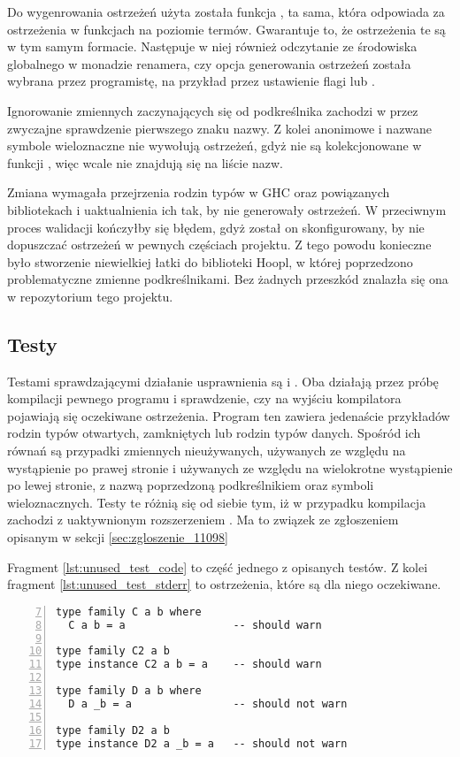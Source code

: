 Do wygenrowania ostrzeżeń użyta została funkcja , ta sama, która odpowiada za ostrzeżenia w funkcjach na poziomie termów. Gwarantuje to, że ostrzeżenia te są w tym samym formacie. Następuje w niej również odczytanie ze środowiska globalnego w monadzie renamera, czy opcja generowania ostrzeżeń została wybrana przez programistę, na przykład przez ustawienie flagi  lub .

Ignorowanie zmiennych zaczynających się od podkreślnika zachodzi w  przez zwyczajne sprawdzenie pierwszego znaku nazwy. Z kolei anonimowe i nazwane symbole wieloznaczne nie wywołują ostrzeżeń, gdyż nie są kolekcjonowane w funkcji , więc wcale nie znajdują się na liście nazw.

Zmiana wymagała przejrzenia rodzin typów w GHC oraz powiązanych bibliotekach i uaktualnienia ich tak, by nie generowały ostrzeżeń. W przeciwnym proces walidacji kończyłby się błędem, gdyż został on skonfigurowany, by nie dopuszczać ostrzeżeń w pewnych częściach projektu. Z tego powodu konieczne było stworzenie niewielkiej łatki do biblioteki Hoopl, w której poprzedzono problematyczne zmienne podkreślnikami. Bez żadnych przeszkód znalazła się ona w repozytorium tego projektu.

\subsection{Testy} %

Testami sprawdzającymi działanie usprawnienia są  i . Oba działają przez próbę kompilacji pewnego programu i sprawdzenie, czy na wyjściu kompilatora pojawiają się oczekiwane ostrzeżenia. Program ten zawiera jedenaście przykładów rodzin typów otwartych, zamkniętych lub rodzin typów danych. Spośród ich równań są przypadki zmiennych nieużywanych, używanych ze względu na wystąpienie po prawej stronie i używanych ze względu na wielokrotne wystąpienie po lewej stronie, z nazwą poprzedzoną podkreślnikiem oraz symboli wieloznacznych. Testy te różnią się od siebie tym, iż w przypadku  kompilacja zachodzi z uaktywnionym rozszerzeniem . Ma to związek ze zgłoszeniem opisanym w sekcji \ref{sec:zgloszenie_11098}

Fragment \ref{lst:unused_test_code} to część jednego z opisanych testów. Z kolei fragment \ref{lst:unused_test_stderr} to ostrzeżenia, które są dla niego oczekiwane.
\begin{lstlisting}[numbers=left,firstnumber=7,label={lst:unused_test_code},
                   caption={Fragment testu \code{UnusedTyVarWarnings} z równaniami wywołującymi ostrzeżenia lub zawierającymi zmienne poprzedzone podkreślnikiem.}]
type family C a b where
  C a b = a                 -- should warn

type family C2 a b
type instance C2 a b = a    -- should warn

type family D a b where
  D a _b = a                -- should not warn

type family D2 a b
type instance D2 a _b = a   -- should not warn
\end{lstlisting}

